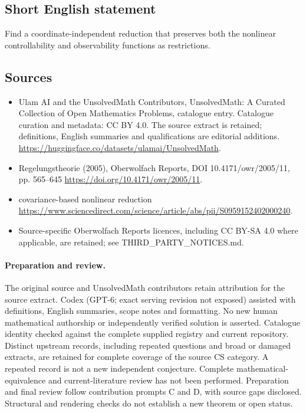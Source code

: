 \documentclass[11pt]{article}
\begin{document}
\subsection{Short English statement}
Find a coordinate-independent reduction that preserves both the nonlinear controllability and observability functions as restrictions.
\subsection{Sources}
\begin{itemize}
\item[\hypertarget{source:statement:1}{S1}] Ulam AI and the UnsolvedMath Contributors, UnsolvedMath: A Curated Collection of Open Mathematics Problems, catalogue entry. Catalogue curation and metadata: CC BY 4.0. The source extract is retained; definitions, English summaries and qualifications are editorial additions.
\url{https://huggingface.co/datasets/ulamai/UnsolvedMath}.
\item[\hypertarget{source:statement:2}{S2}] Regelungstheorie (2005), Oberwolfach Reports, DOI 10.4171/owr/2005/11, pp. 565--645
\url{https://doi.org/10.4171/owr/2005/11}.
\item[\hypertarget{source:statement:3}{S3}] covariance-based nonlinear reduction
\url{https://www.sciencedirect.com/science/article/abs/pii/S0959152402000240}.
\item Source-specific Oberwolfach Reports licences, including CC BY-SA 4.0 where applicable, are retained; see THIRD\_PARTY\_NOTICES.md.
\end{itemize}
\paragraph{Preparation and review.}
The original source and UnsolvedMath contributors retain attribution for the source extract. Codex (GPT-6; exact serving revision not exposed) assisted with definitions, English summaries, scope notes and formatting. No new human mathematical authorship or independently verified solution is asserted. Catalogue identity checked against the complete supplied registry and current repository. Distinct upstream records, including repeated questions and broad or damaged extracts, are retained for complete coverage of the source CS category. A repeated record is not a new independent conjecture. Complete mathematical-equivalence and current-literature review has not been performed. Preparation and final review follow contribution prompts C and D, with source gaps disclosed. Structural and rendering checks do not establish a new theorem or open status.
\label{end:statement}
\end{document}

